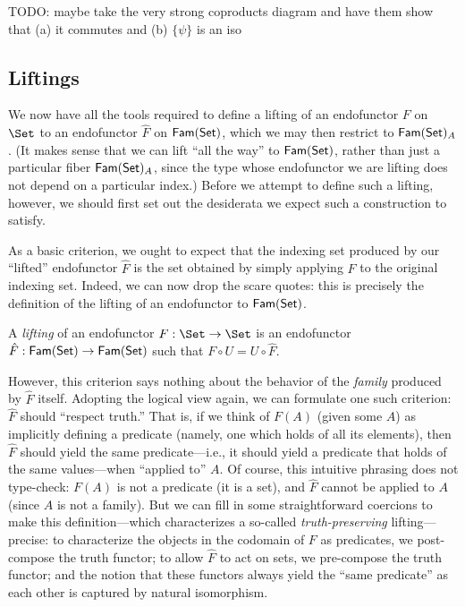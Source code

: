 \begin{exercise}
  TODO: maybe take the very strong coproducts diagram and have them show that (a) it commutes and
  (b) $\{\psi\}$ is an iso
\end{exercise}


\subsection{Liftings}

We now have all the tools required to define a lifting of an endofunctor $F$ on $\Set$ to an
endofunctor $\hat F$ on $\mathsf{Fam}(\mathsf{Set})$, which we may then restrict to $\mathsf{Fam}(\mathsf{Set})_A$. (It makes sense that
we can lift ``all the way'' to $\mathsf{Fam}(\mathsf{Set})$, rather than just a particular fiber $\mathsf{Fam}(\mathsf{Set})_A$, since the
type whose endofunctor we are lifting does not depend on a particular index.) Before we attempt to
define such a lifting, however, we should first set out the desiderata we expect such a construction
to satisfy.

As a basic criterion, we ought to expect that the indexing set produced by our ``lifted''
endofunctor $\hat F$ is the set obtained by simply applying $F$ to the original indexing set.
Indeed, we can now drop the scare quotes: this is precisely the definition of the lifting of an
endofunctor to $\mathsf{Fam}(\mathsf{Set})$.

\begin{definition}[Lifting]
  A \emph{lifting} of an endofunctor $F : \Set \to \Set$ is an endofunctor $\hat F : \mathsf{Fam}(\mathsf{Set}) \to
  \mathsf{Fam}(\mathsf{Set})$ such that $F \circ U = U \circ \hat F$.
\end{definition}

However, this criterion says nothing about the behavior of the \emph{family} produced by $\hat F$
itself. Adopting the logical view again, we can formulate one such criterion: $\hat F$ should
``respect truth.'' That is, if we think of $F(A)$ (given some $A$) as implicitly defining a
predicate (namely, one which holds of all its elements), then $\hat F$ should yield the same
predicate---i.e., it should yield a predicate that holds of the same values---when ``applied to''
$A$. Of course, this intuitive phrasing does not type-check: $F(A)$ is not a predicate (it is a
set), and $\hat F$ cannot be applied to $A$ (since $A$ is not a family). But we can fill in some
straightforward coercions to make this definition---which characterizes a so-called
\emph{truth-preserving} lifting---precise: to characterize the objects in the codomain of $F$ as
predicates, we post-compose the truth functor; to allow $\hat F$ to act on sets, we pre-compose the
truth functor; and the notion that these functors always yield the ``same predicate'' as each other
is captured by natural isomorphism.

